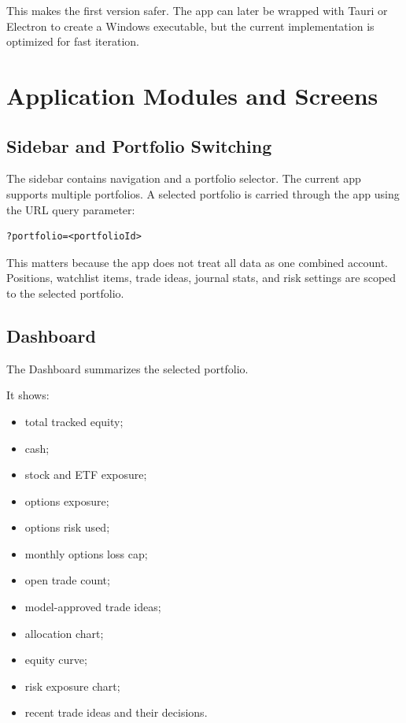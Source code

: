 \documentclass[11pt]{article}
\begin{document}
This makes the first version safer. The app can later be wrapped with Tauri or Electron to create a Windows executable, but the current implementation is optimized for fast iteration.

\section{Application Modules and Screens}

\subsection{Sidebar and Portfolio Switching}

The sidebar contains navigation and a portfolio selector. The current app supports multiple portfolios. A selected portfolio is carried through the app using the URL query parameter:

\begin{lstlisting}
?portfolio=<portfolioId>
\end{lstlisting}

This matters because the app does not treat all data as one combined account. Positions, watchlist items, trade ideas, journal stats, and risk settings are scoped to the selected portfolio.

\subsection{Dashboard}

The Dashboard summarizes the selected portfolio.

It shows:

\begin{itemize}[noitemsep]
  \item total tracked equity;
  \item cash;
  \item stock and ETF exposure;
  \item options exposure;
  \item options risk used;
  \item monthly options loss cap;
  \item open trade count;
  \item model-approved trade ideas;
  \item allocation chart;
  \item equity curve;
  \item risk exposure chart;
  \item recent trade ideas and their decisions.
\end{itemize}
\end{document}
